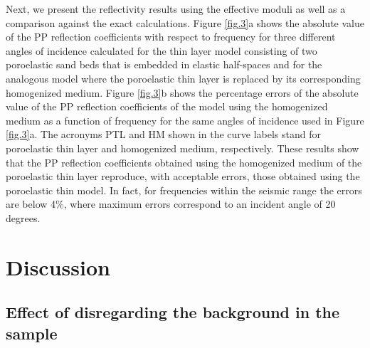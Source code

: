 \documentclass[draft]{agujournal2019}
\begin{document}

Next, we present the reflectivity results using the effective moduli as well as a comparison against the exact calculations. 
Figure \ref{fig.3}a shows the absolute value of the PP reflection coefficients with respect to frequency for three different angles of incidence calculated for the  thin layer model consisting of two poroelastic sand beds that is embedded in elastic half-spaces and for the analogous model where the poroelastic thin layer is replaced by its corresponding homogenized medium.  
Figure \ref{fig.3}b shows the percentage errors of the absolute value of the PP reflection coefficients of the model using the homogenized medium as a function of frequency for the same angles of incidence used in Figure \ref{fig.3}a. The acronyms PTL and HM shown in the curve labels stand for poroelastic thin layer and homogenized medium, respectively. 
These results show that the PP reflection coefficients obtained using the homogenized medium of the poroelastic thin layer reproduce, with acceptable errors, those obtained using the poroelastic thin model. In fact, for frequencies within the seismic range the errors are below 4\%, where maximum errors correspond to an incident angle of 20 degrees. 
\section{Discussion}

\subsection{Effect of disregarding the background in the sample}
\end{document}
